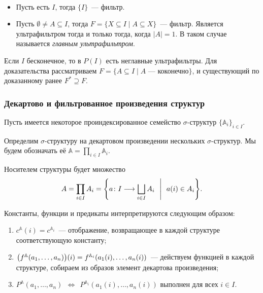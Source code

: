 \begin{exmpl} \ 
    \begin{itemize}
        \item Пусть есть $I$, тогда $\{I\}$~— фильтр. 
        \item Пусть $\emptyset \neq A \subseteq I$, тогда $F = \{X \subseteq I \mid A \subseteq X\}$~— фильтр. Является ультрафильтром тогда и только тогда, когда $|A|=1$. В таком случае называется \emph{главным ультрафильтром}.
    \end{itemize}
\end{exmpl}

\begin{task}
    Если $I$ бесконечное, то в $P(I)$ есть неглавные ультрафильтры. Для доказательства рассматриваем $F = \{A \subseteq I \mid A\text{~— коконечно}\}$, и существующий по доказанному ранее $F^* \supseteq F$. 
\end{task} 

\subsubsection{Декартово и фильтрованное произведения структур} 

Пусть имеется некоторое проиндексированное семейство $\sigma$-структур $\{\mathbb{A}_i\}_{i \in I}$.

\begin{definition}
	Определим \(\sigma\)-структуру на декартовом произведении нескольких \(\sigma\)-структур. Мы будем обозначать её \(\mathbb{A} = \prod_{i \in I} \mathbb{A}_i\).
    
	Носителем структуры будет множество
	   \[ A = \prod\limits_{i \in I} A_i =
	      \set*{a \colon I \longrightarrow \bigsqcup\limits_{i \in I} A_i
	      \ \ \middle\vert\ \ a(i) \in A_i}.\]

	Константы, функции и предикаты интерпретируются следующим образом:
   \begin{enumerate}
	\item \(c^{\mathbb{A}}(i) = c^{\mathbb{A}_i}\)~— отображение, возвращающее в каждой структуре соответствующую константу;
	\item \( \lr*{f^{\mathbb{A}}(a_1, \ldots, a_n)}(i) =
	          f^{\mathbb{A}_i}(a_1(i), \ldots, a_n(i)) \)~— действуем функцией в каждой структуре, собираем из образов элемент декартова произведения;
	\item \(P^{\mathbb{A}}(a_1, \ldots, a_n)\ \ \Longleftrightarrow\ \ 
	        P^{\mathbb{A}_i}(a_1(i), \ldots, a_n(i))\text{\ выполнен для всех\ }i \in I\).
   \end{enumerate}
\end{definition}

